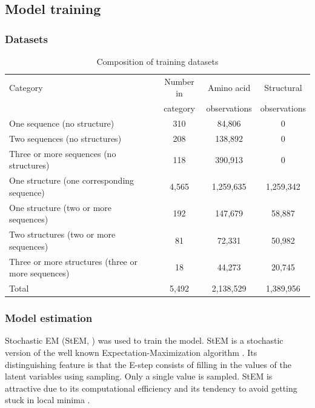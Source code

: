 \documentclass[nogrid]{MBE}%
\begin{document}
\subsection{Model training}

\subsubsection{Datasets}
\begin{table}%
	\centering
	\caption{\label{tab:datasets} Composition of training datasets}
	\begin{tabularx}{0.91\linewidth}{lccc}
		\toprule 
		Category & Number in & Amino acid & Structural\\
		& category & observations & observations\\
		\midrule
		\rowcolor{black!20} One sequence (no structure) &  310 & 84,806 & 0\\
		Two sequences (no structures) & 208 & 138,892 & 0\\
		\rowcolor{black!20} Three or more sequences (no structures) & 118 & 390,913 & 0\\
		One structure (one corresponding sequence) & 4,565 & 1,259,635 & 1,259,342\\
		\rowcolor{black!20} One structure (two or more sequences) &  192 & 147,679 & 58,887\\
		Two structures (two or more sequences) &  81 & 72,331 & 50,982\\
		\rowcolor{black!20} Three or more structures (three or more sequences) & 18 & 44,273 & 20,745\\
		\midrule
		Total & 5,492 & 2,138,529 & 1,389,956\\
		\bottomrule
	\end{tabularx}
\end{table}

\subsubsection{Model estimation}
Stochastic EM (StEM, \citet{gilks1995markov}) was used to train the model. StEM  is a stochastic version of the well known Expectation-Maximization algorithm \citep{gilks1995markov}. Its distinguishing feature is that the E-step consists of filling in the values of the latent variables using sampling. Only a single value is sampled. StEM is attractive due to its computational efficiency and its tendency to avoid getting stuck in local minima \citep{gilks1995markov}.
\end{document}
